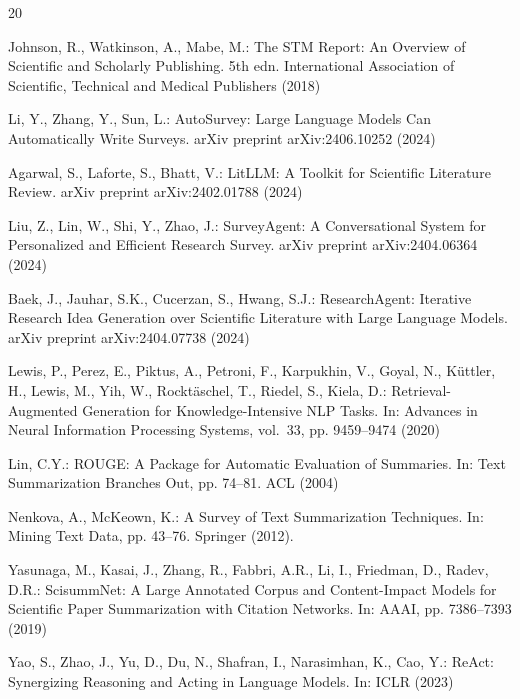\begin{thebibliography}{20}

Johnson, R., Watkinson, A., Mabe, M.: The STM Report: An Overview of Scientific and Scholarly Publishing. 5th edn. International Association of Scientific, Technical and Medical Publishers (2018)

Li, Y., Zhang, Y., Sun, L.: AutoSurvey: Large Language Models Can Automatically Write Surveys. arXiv preprint arXiv:2406.10252 (2024)

Agarwal, S., Laforte, S., Bhatt, V.: LitLLM: A Toolkit for Scientific Literature Review. arXiv preprint arXiv:2402.01788 (2024)

Liu, Z., Lin, W., Shi, Y., Zhao, J.: SurveyAgent: A Conversational System for Personalized and Efficient Research Survey. arXiv preprint arXiv:2404.06364 (2024)

Baek, J., Jauhar, S.K., Cucerzan, S., Hwang, S.J.: ResearchAgent: Iterative Research Idea Generation over Scientific Literature with Large Language Models. arXiv preprint arXiv:2404.07738 (2024)

Lewis, P., Perez, E., Piktus, A., Petroni, F., Karpukhin, V., Goyal, N., K\"{u}ttler, H., Lewis, M., Yih, W., Rockt\"{a}schel, T., Riedel, S., Kiela, D.: Retrieval-Augmented Generation for Knowledge-Intensive NLP Tasks. In: Advances in Neural Information Processing Systems, vol.~33, pp. 9459--9474 (2020)

Lin, C.Y.: ROUGE: A Package for Automatic Evaluation of Summaries. In: Text Summarization Branches Out, pp. 74--81. ACL (2004)

Nenkova, A., McKeown, K.: A Survey of Text Summarization Techniques. In: Mining Text Data, pp. 43--76. Springer (2012). 

Yasunaga, M., Kasai, J., Zhang, R., Fabbri, A.R., Li, I., Friedman, D., Radev, D.R.: ScisummNet: A Large Annotated Corpus and Content-Impact Models for Scientific Paper Summarization with Citation Networks. In: AAAI, pp. 7386--7393 (2019)

Yao, S., Zhao, J., Yu, D., Du, N., Shafran, I., Narasimhan, K., Cao, Y.: ReAct: Synergizing Reasoning and Acting in Language Models. In: ICLR (2023)


\end{thebibliography}
